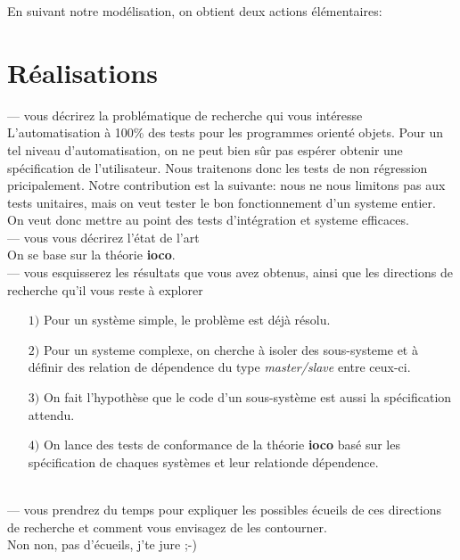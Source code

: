 \documentclass[a4paper]{report}
\begin{document}
En suivant notre modélisation, on obtient deux actions élémentaires:


\chapter*{Réalisations}



--- vous décrirez la problématique de recherche qui vous intéresse\\
\newline
L'automatisation à 100\% des tests pour les programmes orienté objets. Pour un tel niveau d'automatisation, on ne peut bien sûr pas espérer obtenir une spécification de l'utilisateur. Nous traitenons donc les tests de non régression pricipalement. Notre contribution est la suivante: nous ne nous limitons pas aux tests unitaires, mais on veut tester le bon fonctionnement d'un systeme entier. On veut donc mettre au point des tests d'intégration et systeme efficaces.\\
\newline
\newline
--- vous vous décrirez l'état de l'art\\
\newline
On se base sur la théorie \textbf{ioco}.\\
\newline
\newline
--- vous esquisserez les résultats que vous avez obtenus, ainsi que  les directions de recherche qu'il vous reste à explorer\\
\newline
\begin{itemize}
\item[$ 1) $] Pour un système simple, le problème est déjà résolu.
\item[$ 2) $] Pour un systeme complexe, on cherche à isoler des sous-systeme et à définir des relation de dépendence du type \textit{master/slave} entre ceux-ci.
\item[$ 3) $] On fait l'hypothèse que le code d'un sous-système est aussi la spécification attendu.
\item[$ 4) $] On lance des tests de conformance de la théorie \textbf{ioco} basé sur les spécification de chaques systèmes et leur relationde dépendence.
\end{itemize}
$ $\\
\newline
\newline
--- vous prendrez du temps pour expliquer les possibles écueils de ces directions de recherche et comment vous envisagez de les contourner.\\
\newline
Non non, pas d'écueils, j'te jure ;-)\\
\end{document}
